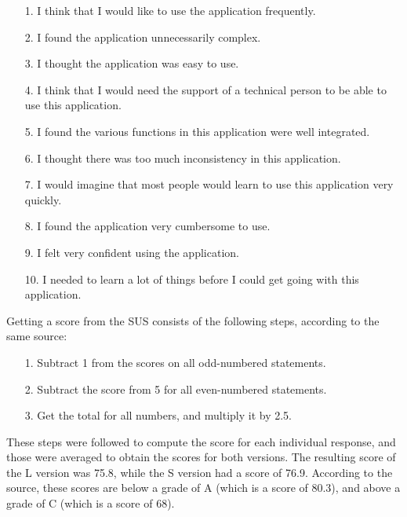 \documentclass[journal]{./IEEE/IEEEtran}
\begin{document}
\begin{enumerate}{}

\item[1.] I think that I would like to use the application frequently.

\item[2.] I found the application unnecessarily complex.

\item[3.] I thought the application was easy to use.

\item[4.] I think that I would need the support of a technical person to be able to use this application.

\item[5.] I found the various functions in this application were well integrated.

\item[6.] I thought there was too much inconsistency in this application.

\item[7.] I would imagine that most people would learn to use this application very quickly.

\item[8.] I found the application very cumbersome to use.

\item[9.] I felt very confident using the application.

\item[10.] I needed to learn a lot of things before I could get going with this application.

\end{enumerate}

Getting a score from the SUS consists of the following steps, according to the same source:

\begin{enumerate}{}

\item[1.] Subtract 1 from the scores on all odd-numbered statements.

\item[2.] Subtract the score from 5 for all even-numbered statements.

\item[3.] Get the total for all numbers, and multiply it by 2.5.

\end{enumerate}

These steps were followed to compute the score for each individual response, and those were averaged to obtain the scores for both versions. The resulting score of the L version was 75.8, while the S version had a score of 76.9. According to the source, these scores are below a grade of A (which is a score of 80.3), and above a grade of C (which is a score of 68).
\end{document}
